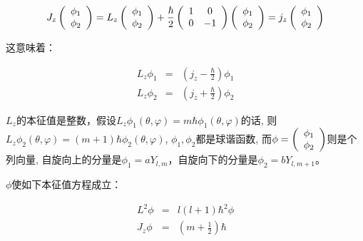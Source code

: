 \begin{equation*}
J_z \left( {\begin{array}{*{20}c}
   \phi_1  \\
   \phi_2  \\
 \end{array} } \right) = L_z \left( {\begin{array}{*{20}c}
   \phi_1  \\
   \phi_2  \\
 \end{array} } \right) + \frac{\hbar}{2} \left( {\begin{array}{*{20}c}
   1 & 0  \\
   0 & { - 1}  \\
 \end{array} } \right)
  \left( {\begin{array}{*{20}c}
   \phi_1  \\
   \phi_2  \\
 \end{array} } \right)
= j_z \left( {\begin{array}{*{20}c}
   \phi_1  \\
   \phi_2  \\
 \end{array} } \right)
\end{equation*}


这意味着：

\begin{eqnarray*}
  L_z \phi_1 &=& (j_z - \frac{\hbar}{2} ) \phi_1  \\
  L_z \phi_2 &=& (j_z + \frac{\hbar}{2}) \phi_2
\end{eqnarray*}

$L_z$的本征值是整数，假设$L_z \phi_1 (\theta, \varphi) = m \hbar
\phi_1 (\theta, \varphi)$的话, 则$L_z \phi_2 (\theta, \varphi) =
(m+1)\hbar \phi_2 (\theta, \varphi)$, $\phi_1, \phi_2$都是球谐函数,
而$\phi = \left( {\begin{array}{*{20}c}
   \phi_1  \\
   \phi_2  \\
 \end{array} } \right)$则是个列向量, 自旋向上的分量是$\phi_1 = a Y_{l,m}$，自旋向下的分量是$\phi_2 = b Y_{l,m+1}$。


$\phi$使如下本征值方程成立：

\begin{eqnarray*}
  L^2 \phi &=& l(l+1)\hbar^2 \phi \\
  J_z \phi &=& (m + \frac{1}{2}) \hbar
\end{eqnarray*}


